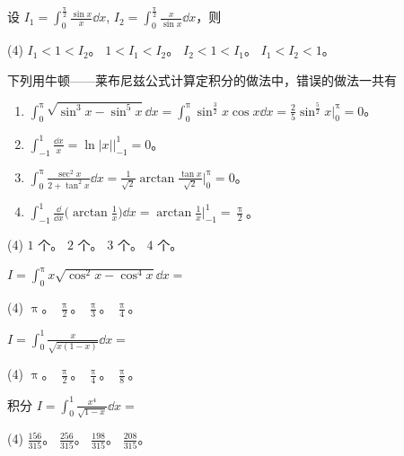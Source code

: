 \begin{ti}
	设 $I_1 = \int_0^{\frac{\uppi}{2}} \frac{\sin x}{x} \dd{x}$, $I_2 = \int_0^{\frac{\uppi}{2}} \frac{x}{\sin x} \dd{x}$，则
	\begin{tasks}(4)
		\task $I_1 < 1 < I_2$。
		\task $1 < I_1 < I_2$。
		\task $I_2 < 1 < I_1$。
		\task $I_1 < I_2 < 1$。
	\end{tasks}
\end{ti}

\begin{ti}
	下列用牛顿——莱布尼兹公式计算定积分的做法中，错误的做法一共有
	\begin{enumerate}
		\item $\int_0^\uppi \sqrt{\sin^3x - \sin^5x} \dd{x} = \int_0^\uppi \sin^{\frac{3}{2}}x \cos x \dd{x} = \frac{2}{5} \sin^{\frac{5}{2}}x \biggr|_0^\uppi = 0$。
		\item $\int_{-1}^1 \frac{\dd{x}}{x} = \ln|x| \bigr|_{-1}^1 = 0$。
		\item $\int_0^\uppi \frac{\sec^2x}{2 + \tan^2x} \dd{x} = \frac{1}{\sqrt{2}} \arctan \frac{\tan x}{\sqrt{2}} \biggr|_0^\uppi = 0$。
		\item $\int_{-1}^1 \frac{\dd}{\dd{x}} \biggl( \arctan \frac{1}{x} \biggr) \dd{x} = \arctan \frac{1}{x} \biggr|_{-1}^1 = \frac{\uppi}{2}$。
	\end{enumerate}
	\begin{tasks}(4)
		\task $1$ 个。
		\task $2$ 个。
		\task $3$ 个。
		\task $4$ 个。
	\end{tasks}
\end{ti}

\begin{ti}
	$I = \int_0^\uppi x \sqrt{\cos^2x - \cos^4x} \dd{x} = $
	\begin{tasks}(4)
		\task $\uppi$。
		\task $\frac{\uppi}{2}$。
		\task $\frac{\uppi}{3}$。
		\task $\frac{\uppi}{4}$。
	\end{tasks}
\end{ti}

\begin{ti}
	$I = \int_0^1 \frac{x}{\sqrt{x(1-x)}} \dd{x} = $
	\begin{tasks}(4)
		\task $\uppi$。
		\task $\frac{\uppi}{2}$。
		\task $\frac{\uppi}{4}$。
		\task $\frac{\uppi}{8}$。
	\end{tasks}
\end{ti}

\begin{ti}
	积分 $I = \int_0^1 \frac{x^4}{\sqrt{1-x}} \dd{x} = $
	\begin{tasks}(4)
		\task $\frac{156}{315}$。
		\task $\frac{256}{315}$。
		\task $\frac{198}{315}$。
		\task $\frac{208}{315}$。
	\end{tasks}
\end{ti}

